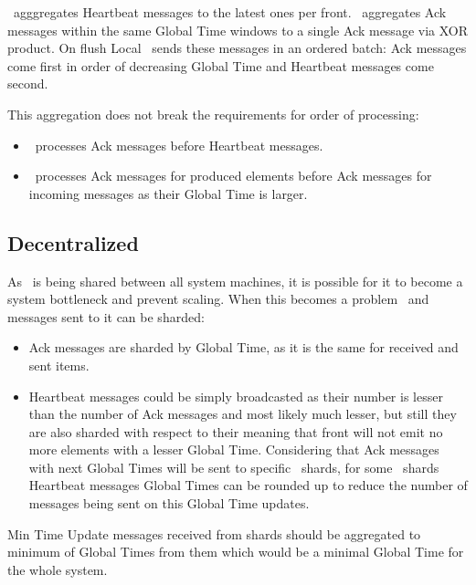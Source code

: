 \tracker\ agggregates Heartbeat messages to the latest ones per front. \tracker\ aggregates Ack messages within the same Global Time windows to a single Ack message via XOR product. On flush Local \tracker\ sends these messages in an ordered batch: Ack messages come first in order of decreasing Global Time and Heartbeat messages come second.

This aggregation does not break the requirements for order of processing:
\begin{itemize}
	\item \tracker\ processes Ack messages before Heartbeat messages.
	\item \tracker\ processes Ack messages for produced elements before Ack messages for incoming messages as their Global Time is larger.
\end{itemize}

\subsection{Decentralized \tracker\ }

As \tracker\ is being shared between all system machines, it is possible for it to become a system bottleneck and prevent scaling. When this becomes a problem \tracker\ and messages sent to it can be sharded:
\begin{itemize}
	\item Ack messages are sharded by Global Time, as it is the same for received and sent items.
	\item Heartbeat messages could be simply broadcasted as their number is lesser than the number of Ack messages and most likely much lesser, but still they are also sharded with respect to their meaning that  front will not emit no more elements with a lesser Global Time. Considering that Ack messages with next Global Times will be sent to specific \tracker\ shards, for some \tracker\ shards Heartbeat messages Global Times can be rounded up to reduce the number of messages being sent on this Global Time updates.
\end{itemize}

Min Time Update messages received from shards should be aggregated to minimum of Global Times from them which would be a minimal Global Time for the whole system.

